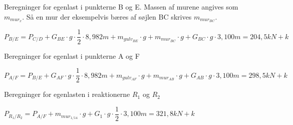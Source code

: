 Beregninger for egenlast i punkterne B og E. 
\newline
Massen af murene angives som $ m_{mur_{x}} $. Så en mur der eksempelvis bæres af søjlen BC skrives $ m_{mur_{BC}} $.
\begin{center}
	$ P_{B/E}=P_{C/D}+G_{BE}\cdot g\cdot \dfrac{1}{2}\cdot 8,982m+m_{gulv_{BE}}\cdot g+m_{mur_{BC}}\cdot g+G_{BC}\cdot g\cdot 3,100m=204,5kN+k$
\end{center}

Beregninger for egenlast i punkterne A og F
\begin{center}
	$ P_{A/F}=P_{B/E}+G_{AF}\cdot g\cdot \dfrac{1}{2}\cdot 8,982m+m_{gulv_{AF}}\cdot g+m_{mur_{AB}}\cdot g+G_{AB}\cdot g\cdot 3,100m =298,5kN+k$
\end{center}

Beregninger for egenlasten i reaktionerne $ R_{1} $ og $ R_{2} $
\begin{center}
	$ P_{R_{1}/R_{2}}=P_{A/F}+m_{mur_{1/14}}\cdot g+G_{1}\cdot g\cdot \dfrac{1}{2}\cdot 3,100m=321,8kN+k$
\end{center}






